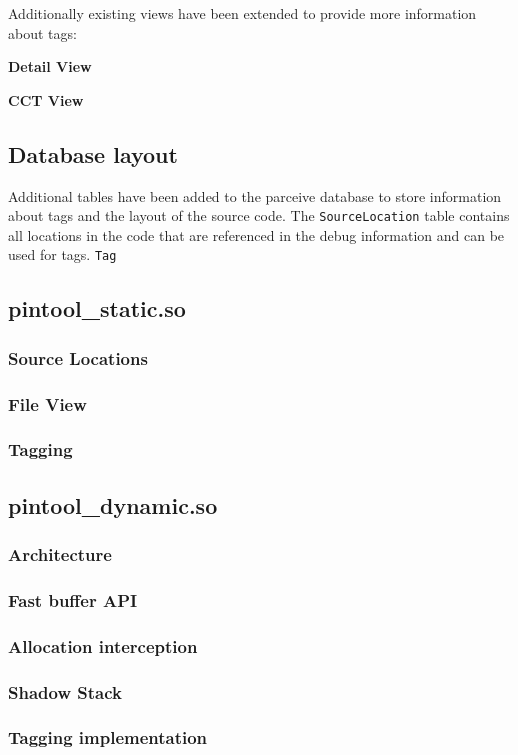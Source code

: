 Additionally existing views have been extended to provide more information about tags:

\textbf{Detail View}

\textbf{CCT View}

\subsection{Database layout}

Additional tables have been added to the parceive database to store information about tags and the layout of the source code. The \texttt{SourceLocation} table contains all locations in the code that are referenced in the debug information and can be used for tags. \texttt{Tag} 

\subsection{pintool\_static.so}
\subsubsection{Source Locations}
\subsubsection{File View}
\subsubsection{Tagging}

\subsection{pintool\_dynamic.so}
\subsubsection{Architecture}
\subsubsection{Fast buffer API}
\subsubsection{Allocation interception}
\subsubsection{Shadow Stack}
\subsubsection{Tagging implementation}
